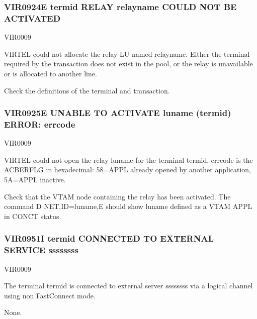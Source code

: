 \documentclass[letterpaper,10pt,english]{sphinxmanual}
\begin{document}
\subsubsection{VIR0924E termid RELAY relayname COULD NOT BE ACTIVATED}
\label{\detokenize{messages:vir0924e-termid-relay-relayname-could-not-be-activated}}\begin{description}
\sphinxAtStartPar
VIR0009

\sphinxAtStartPar
VIRTEL could not allocate the relay LU named relayname. Either the terminal required by the transaction does not exist in the pool, or the relay is unavailable or is allocated to another line.

\sphinxAtStartPar
Check the definitions of the terminal and transaction.

\end{description}


\subsubsection{VIR0925E UNABLE TO ACTIVATE luname (termid) ERROR: errcode}
\label{\detokenize{messages:vir0925e-unable-to-activate-luname-termid-error-errcode}}\begin{description}
\sphinxAtStartPar
VIR0009

\sphinxAtStartPar
VIRTEL could not open the relay luname for the terminal termid. errcode is the ACBERFLG in hexadecimal: 58=APPL already opened by another application, 5A=APPL inactive.

\sphinxAtStartPar
Check that the VTAM node containing the relay has been activated. The command D NET,ID=luname,E should show luname defined as a VTAM APPL in CONCT status.

\end{description}


\subsubsection{VIR0951I termid CONNECTED TO EXTERNAL SERVICE ssssssss}
\label{\detokenize{messages:vir0951i-termid-connected-to-external-service-ssssssss}}\begin{description}
\sphinxAtStartPar
VIR0009

\sphinxAtStartPar
The terminal termid is connected to external server ssssssss via a logical channel using non Fast\sphinxhyphen{}Connect mode.

\sphinxAtStartPar
None.

\end{description}
\end{document}
